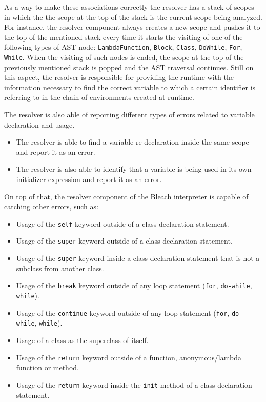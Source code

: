 As a way to make these associations correctly the resolver has a stack of scopes in which the the scope at the top of the stack is the current scope being analyzed. For instance, the resolver component always creates a new scope and pushes it to the top of the mentioned stack every time it starts the visiting of one of the following types of AST node: \texttt{LambdaFunction}, \texttt{Block}, \texttt{Class}, \texttt{DoWhile}, \texttt{For}, \texttt{While}. When the visiting of such nodes is ended, the scope at the top of the previously mentioned stack is popped and the AST traversal continues. Still on this aspect, the resolver is responsible for providing the runtime with the information necessary to find the correct variable to which a certain identifier is referring to in the chain of environments created at runtime.

The resolver is also able of reporting different types of errors related to variable declaration and usage.
\begin{itemize}
    \item The resolver is able to find a variable re-declaration inside the same scope and report it as an error.
    \item The resolver is also able to identify that a variable is being used in its own initializer expression and report it as an error.   
\end{itemize}

On top of that, the resolver component of the Bleach interpreter is capable of catching other errors, such as:
\begin{itemize}
    \item Usage of the \texttt{self} keyword outside of a class declaration statement.
    \item Usage of the \texttt{super} keyword outside of a class declaration statement.
    \item Usage of the \texttt{super} keyword inside a class declaration statement that is not a subclass from another class.
    \item Usage of the \texttt{break} keyword outside of any loop statement (\texttt{for}, \texttt{do-while}, \texttt{while}).
    \item Usage of the \texttt{continue} keyword outside of any loop statement (\texttt{for}, \texttt{do-while}, \texttt{while}).
    \item Usage of a class as the superclass of itself.
    \item Usage of the \texttt{return} keyword outside of a function, anonymous/lambda function or method.
    \item Usage of the \texttt{return} keyword inside the \texttt{init} method of a class declaration statement.
\end{itemize}

